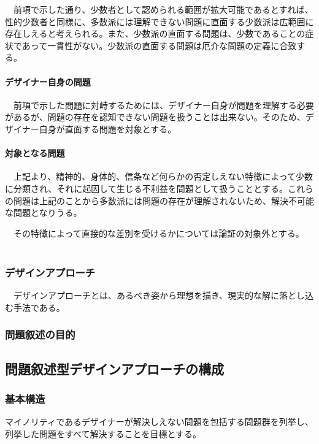 \documentclass{jsarticle}
\begin{document}
　前項で示した通り、少数者として認められる範囲が拡大可能であるとすれば、性的少数者と同様に、多数派には理解できない問題に直面する少数派は広範囲に存在しえると考えられる。また、少数派の直面する問題は、少数であることの症状であって一貫性がない。少数派の直面する問題は厄介な問題の定義に合致する。

\paragraph*{デザイナー自身の問題}

　前項で示した問題に対峙するためには、デザイナー自身が問題を理解する必要があるが、問題の存在を認知できない問題を扱うことは出来ない。そのため、デザイナー自身が直面する問題を対象とする。

\paragraph*{対象となる問題}

　上記より、精神的、身体的、信条など何らかの否定しえない特徴によって少数に分類され、それに起因して生じる不利益を問題として扱うこととする。これらの問題は上記のことから多数派には問題の存在が理解されないため、解決不可能な問題となりうる。

　その特徴によって直接的な差別を受けるかについては論証の対象外とする。
　

\subsubsection{デザインアプローチ}
　デザインアプローチとは、あるべき姿から理想を描き、現実的な解に落とし込む手法である。

\subsubsection{問題叙述の目的}


\subsubsection{}


\newpage
\subsection{問題叙述型デザインアプローチの構成}
\subsubsection{基本構造}
マイノリティであるデザイナーが解決しえない問題を包括する問題群を列挙し、列挙した問題をすべて解決することを目標とする。
\end{document}
